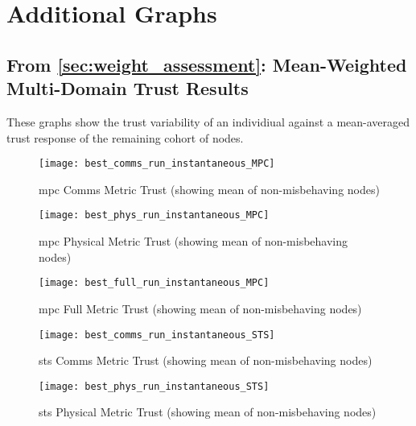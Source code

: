 %

\chapter{Additional Graphs}
\label{apx:graph_overflow}

\section{From \autoref{sec:weight_assessment}: Mean-Weighted Multi-Domain Trust Results}\label{sec:apx_mean_targeting_malicious}


These graphs show the trust variability of an individiual against a mean-averaged trust response of the remaining cohort of nodes.



\begin{figure}[h]
  \centering
  \texttt{[image: best\_comms\_run\_instantaneous\_MPC]}
  \caption{\gls{mpc} Comms Metric Trust (showing mean of non-misbehaving nodes)}
  \label{fig:comms_instantaneous_mpc}
\end{figure}

\begin{figure}[h]
  \centering
  \texttt{[image: best\_phys\_run\_instantaneous\_MPC]}
  \caption{\gls{mpc} Physical Metric Trust (showing mean of non-misbehaving nodes)}
  \label{fig:phys_instantaneous_mpc}
\end{figure}

\begin{figure}[h]
  \centering
  \texttt{[image: best\_full\_run\_instantaneous\_MPC]}
  \caption{\gls{mpc} Full Metric Trust (showing mean of non-misbehaving nodes)}
  \label{fig:full_instantaneous_mpc}
\end{figure}


\begin{figure}[h]
  \centering
  \texttt{[image: best\_comms\_run\_instantaneous\_STS]}
  \caption{\gls{sts} Comms Metric Trust (showing mean of non-misbehaving nodes)}
  \label{fig:comms_instantaneous_sts}
\end{figure}

\begin{figure}[h]
  \centering
  \texttt{[image: best\_phys\_run\_instantaneous\_STS]}
  \caption{\gls{sts} Physical Metric Trust (showing mean of non-misbehaving nodes)}
  \label{fig:phys_instantaneous_sts}
\end{figure}

